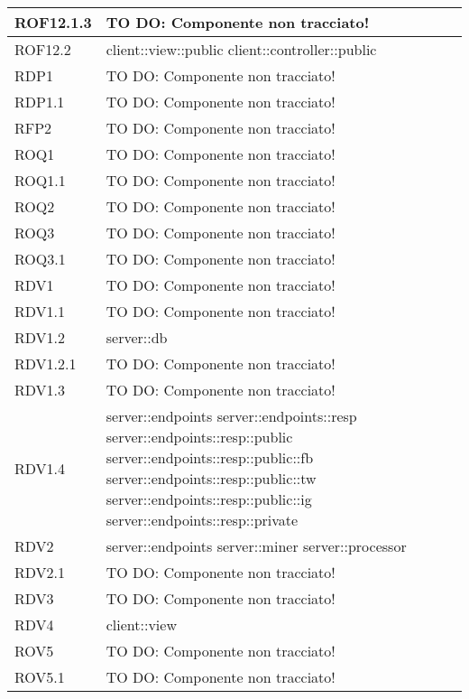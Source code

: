 \begin{center}
\begin{longtable}{| p{4cm} | p{8cm} |}
\hline
ROF12.1.3 & TO DO: Componente non tracciato! \\
\hline
ROF12.2 & client::view::public \newline client::controller::public \\
\hline
RDP1 & TO DO: Componente non tracciato! \\
\hline
RDP1.1 & TO DO: Componente non tracciato! \\
\hline
RFP2 & TO DO: Componente non tracciato! \\
\hline
ROQ1 & TO DO: Componente non tracciato! \\
\hline
ROQ1.1 & TO DO: Componente non tracciato! \\
\hline
ROQ2 & TO DO: Componente non tracciato! \\
\hline
ROQ3 & TO DO: Componente non tracciato! \\
\hline
ROQ3.1 & TO DO: Componente non tracciato! \\
\hline
RDV1 & TO DO: Componente non tracciato! \\
\hline
RDV1.1 & TO DO: Componente non tracciato! \\
\hline
RDV1.2 & server::db \\
\hline
RDV1.2.1 & TO DO: Componente non tracciato! \\
\hline
RDV1.3 & TO DO: Componente non tracciato! \\
\hline
RDV1.4 & server::endpoints \newline server::endpoints::resp \newline server::endpoints::resp::public \newline server::endpoints::resp::public::fb \newline server::endpoints::resp::public::tw \newline server::endpoints::resp::public::ig \newline server::endpoints::resp::private \\
\hline
RDV2 & server::endpoints \newline server::miner \newline server::processor \\
\hline
RDV2.1 & TO DO: Componente non tracciato! \\
\hline
RDV3 & TO DO: Componente non tracciato! \\
\hline
RDV4 & client::view \\
\hline
ROV5 & TO DO: Componente non tracciato! \\
\hline
ROV5.1 & TO DO: Componente non tracciato! \\

\end{longtable}
\end{center}
